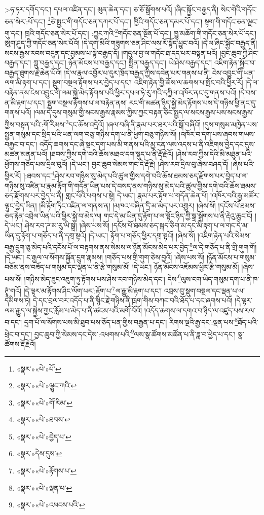  >ཧ་ཧར་དགོད་དང་། དཔལ་འཛིན་དང་། མུན་ཆེན་དང་། ཅ་ཅོ་སྒྲོགས་པའོ། །ཞིང་སྐྱོང་བརྒྱད་ནི། སེང་གེའི་གདོང་ཅན་སེར་:པོ་དང་། \footnote{«སྣར་»«པེ་»པོ་}ཅེ་སྤྱང་གི་གདོང་ཅན་དཀར་པོ་དང་། ཁྱིའི་གདོང་ཅན་དམར་པོ་དང་། སྟག་གི་གདོང་ཅན་ལྗང་གུ་དང་། ཁྲའི་གདོང་ཅན་སེར་པོ་དང་། :ཀྱུང་ཀའི་\footnote{«སྣར་»«པེ་»ལྕུང་ཀའི་}གདོང་ཅན་སྔོན་པོ་དང་། ཁྱུ་མཆོག་གི་གདོང་ཅན་སེར་པོ་དང་། ཨུག་ཤུད་ཀྱི་གདོང་ཅན་སེར་པོའོ། །དེ་དག་མིའི་གཟུགས་ཅན་ཤིང་ལས་རོ་སྟོད་ཕྱུང་བའོ། །དེ་ལ་ཞིང་སྐྱོང་བརྒྱད་ནི། སངས་རྒྱས་རབས་བདུན་དང་བྱམས་པ་སྟེ་བརྒྱད་དོ། །གདུལ་བྱ་ལ་གདོང་ཐ་དད་པར་བསྟན་པའོ། །བྱང་ཆུབ་ཀྱི་ཤིང་བརྒྱད་དང་། ཀླུ་བརྒྱད་དང་། ཉོན་མོངས་པ་བརྒྱད་དང་། སྤྲིན་བརྒྱད་དང་། ཡེ་ཤེས་བརྒྱད་དང་། འཇིག་རྟེན་སྐྱོང་བ་བརྒྱད་ཐུགས་རྗེ་ཆེན་པོའོ། །དེ་ལ་རྣལ་འབྱོར་པ་དུར་ཁྲོད་བརྒྱད་ཀྱིས་དབེན་པར་གནས་པ་ནི། ངེས་འབྱུང་གི་ཡན་ལག་མི་རྟག་པ་དང་། སྡུག་བསྔལ་རྟོགས་པར་བྱེད་པ་དང་། འཇིག་རྟེན་གྱི་ཆོས་ལ་ཆགས་པ་སྤོང་བའི་ཕྱིར་རོ། །དེ་ལ་བརྟེན་ནས་ངེས་འབྱུང་གི་ལམ་སྐྱེ་མེད་རྟོགས་པའི་ཕྱིར་དཔལ་ཧེ་རུ་ཀའི་དཀྱིལ་འཁོར་ནང་དུ་གནས་པའོ། །དེ་བས་ན་མི་རྟག་པ་དང་། སྡུག་བསྔལ་རྟོགས་པ་ལ་བརྟེན་ནས། རང་གི་མཚན་ཉིད་སྐྱེ་མེད་རྟོགས་པས་དེ་གཉིས་ཕྱི་ནང་དུ་གནས་པའོ། །ལམ་དེ་དུས་གསུམ་གྱི་སངས་རྒྱས་རྣམས་ཀྱིས་ཀྱང་བརྟན་ཅིང་སྤྱད་ལ་སངས་རྒྱས་པས་སངས་རྒྱས་ཀྱིས་བསྟན་པའི་:གོ་རིམས་\footnote{«སྣར་»«པེ་»གོ་རིམ་}དང་ཆོས་འདྲེའོ། །ཞལ་བཞི་ནི་རྣམ་པར་ཐར་པའི་སྒོ་བཞིའོ། །དུས་གསུམ་མཁྱེན་པས་སྤྱན་གསུམ་དང་སྲིད་པའི་ཡན་ལག་བཅུ་གཉིས་དག་པ་ནི་ཕྱག་བཅུ་གཉིས་སོ། །འཁོར་བ་དག་པས་ཞབས་གཡས་བརྐྱང་བ་དང་། འདོད་ཆགས་དང་ཞེ་སྡང་དག་པས་མི་གནས་པའི་མྱ་ངན་ལས་འདས་པ་ནི་འཇིགས་བྱེད་དང་དུས་མཚན་མནན་པའོ། །ཐབས་ཀྱིས་དགེ་བའི་ཆོས་མཐའ་དག་སྡུད་པ་ནི་རྡོ་རྗེའོ། །ཤེས་རབ་ཀྱིས་དེའི་མི་མཐུན་པའི་ཕྱོགས་གཅོད་པས་དྲིལ་བུའོ། །དེ་ཡང་། བྱང་ཆུབ་སེམས་གང་དེ་རྡོ་རྗེ། །ཤེས་རབ་དྲིལ་བུ་ཞེས་བཤད་དོ། །ཞེས་པའི་ཕྱིར་རོ། །:ཐབས་དང་\footnote{«སྣར་»«པེ་»ཐབས་}ཤེས་རབ་གཉིས་སུ་མེད་པའི་ཚུལ་གྱིས་དགེ་བའི་ཆོས་ཐམས་ཅད་རྫོགས་པར་བྱེད་པ་ལ་གཉིས་སུ་འཛིན་པ་རྣམ་རྟོག་གི་གདོན་ཡིན་པས་དེ་བསད་ནས་གཉིས་སུ་མེད་པའི་ཚུལ་གྱིས་དགེ་བའི་ཆོས་ཐམས་ཅད་རྫོགས་པར་བྱེད་པ་ནི། གླང་པོའི་པགས་པ་སྟེ། དེ་ཡང་། རྣམ་པར་རྟོག་པ་གདོན་ཆེན་པོ། །འཁོར་བའི་རྒྱ་མཚོར་ལྟུང་བྱེད་ཡིན། །མི་རྟོག་ཏིང་འཛིན་ལ་གནས་ན། །མཁའ་བཞིན་དྲི་མ་མེད་པར་འགྱུར། །ཞེས་སོ། །དངོས་པོ་ཐམས་ཅད་རྟེན་འབྲེལ་ཡིན་པའི་ཕྱིར་སྐྱེ་བ་མེད་ལ། གང་དེ་མ་ཡིན་དུ་རྟོག་པ་ལ་སྟོང་ཉིད་ཀྱི་སྒྲ་སྒྲོགས་པ་ནི་རྡེའུ་ཆུང་ངོ། །དེ་ཡང་། ཤེས་རབ་ཌ་མ་རུ་ཡི་སྒྲ། །ཞེས་པས་སོ། །དངོས་པོ་ཐམས་ཅད་སྐད་ཅིག་མ་དང་མི་རྟག་པ་ལ་གང་དེ་མ་ཡིན་དུ་རྟོག་པ་གཅོད་པ་ནི་དགྲ་སྟའོ། །དེ་ཡང་། རྟོག་པ་གཅོད་ཕྱིར་དགྲ་སྟའོ། །ཞེས་སོ། །འཇིག་རྟེན་པའི་སེམས་བརྒྱ་དྲུག་ཅུ་མེད་པའི་དངོས་པོ་ལ་བརྟགས་ནས་སེམས་ལ་ཉོན་མོངས་མེད་པར་བྱེད་\footnote{«སྣར་»«པེ་»བྱེད་པ་}ལ་དེ་གཅོད་པ་ནི་གྲི་གུག་གོ། །དེ་ཡང་། ང་རྒྱལ་ལ་སོགས་སྐྱོན་དྲུག་རྣམས། །གཅོད་པས་གྲི་གུག་ཅེས་བྱའོ། །ཞེས་པས་སོ། །ཉོན་མོངས་པ་གསུམ་བཅོམ་ནས་བཟོད་པ་གསུམ་དང་ལྡན་པ་ནི་རྩེ་གསུམ་མོ། །དེ་ཡང་། ཉོན་མོངས་འཇོམས་ཕྱིར་རྩེ་གསུམ་མོ། །ཞེས་པས་སོ། །གཉིས་མེད་ཟུང་འཇུག་ཏུ་རྟོགས་པས་ཤེས་རབ་གཉིས་མེད་དང་། དེས་\footnote{«སྣར་»དེས་དུས་}ལུས་ངག་ཡིད་གསུམ་དག་པ་ནི་ཁ་ཊྭཱཾ་གའོ། །དེ་ལྟར་མ་རྟོགས་ཤིང་ལོག་པར་:རྟོག་པ་\footnote{«སྣར་»«པེ་»རྟོགས་པ་}ལ་རྒྱུ་མི་རྟག་པ་དང་། འབྲས་བུ་སྡུག་བསྔལ་དང་ལྡན་པ་ལ་དམིགས་ཏེ། དེ་དང་བྲལ་བར་འདོད་པ་ནི་སྙིང་རྗེ་གཉིས་ནི་ཁྲག་གིས་བཀང་བའི་ཐོད་པ་དང་ཞགས་པའོ། །དེ་ལྟར་ལམ་རྒྱུད་ལ་སྐྱེས་ཀྱང་རློམ་པ་མེད་པ་ནི་ཚངས་པའི་མགོ་བོའོ། །འདོད་ཆགས་ལ་དགའ་བ་ཉིད་ལ་འཛུད་པས་རལ་བ་དང་། དྲག་པོ་ལ་སོགས་པས་མི་ཐུབ་པས་ཅོད་པན་གྱིས་བརྒྱན་པ་དང་། རིགས་ལྔའི་རྒྱ་དང་:ལྡན་པས་\footnote{«སྣར་»«པེ་»ལྡན་པ་}ཐོད་པའི་ཕྲེང་བ་དང་། བྱང་ཆུབ་ཀྱི་སེམས་དང་དེས་:འཕགས་པའི་\footnote{«སྣར་»«པེ་»འཕངས་པའི་}ལས་སྣ་ཚོགས་མཚོན་པ་ནི་ཟླ་བ་ཕྱེད་པ་དང་། སྣ་ཚོགས་རྡོ་རྗེའོ། 